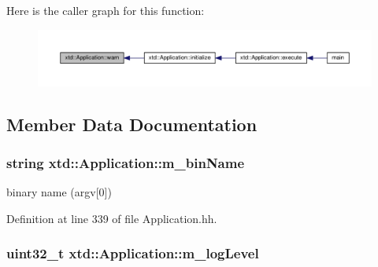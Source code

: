 Here is the caller graph for this function\+:
\nopagebreak
\begin{figure}[H]
\begin{center}
\leavevmode
\includegraphics[width=350pt]{classxtd_1_1Application_a931877468f6b948909d596d91d60b7a2_icgraph}
\end{center}
\end{figure}




\subsection{Member Data Documentation}
\subsubsection[{\texorpdfstring{m\+\_\+bin\+Name}{m_binName}}]{\setlength{\rightskip}{0pt plus 5cm}string xtd\+::\+Application\+::m\+\_\+bin\+Name\hspace{0.3cm}{\ttfamily [protected]}}\hypertarget{classxtd_1_1Application_abdf4c6f863c5a7a4ee842906f546c458}{}\label{classxtd_1_1Application_abdf4c6f863c5a7a4ee842906f546c458}


binary name (argv\mbox{[}0\mbox{]}) 



Definition at line 339 of file Application.\+hh.

\subsubsection[{\texorpdfstring{m\+\_\+log\+Level}{m_logLevel}}]{\setlength{\rightskip}{0pt plus 5cm}uint32\+\_\+t xtd\+::\+Application\+::m\+\_\+log\+Level\hspace{0.3cm}{\ttfamily [protected]}}\hypertarget{classxtd_1_1Application_a3f815061d81aa12974b2b6ee48b9f5e9}{}\label{classxtd_1_1Application_a3f815061d81aa12974b2b6ee48b9f5e9}


